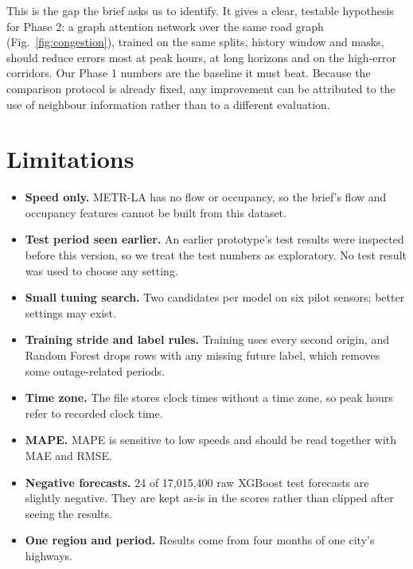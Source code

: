 \documentclass[conference]{IEEEtran}
\begin{document}
This is the gap the brief asks us to identify. It gives a clear, testable hypothesis for Phase 2: a graph attention network \cite{gat} over the same road graph (Fig.~\ref{fig:congestion}), trained on the same splits, history window and masks, should reduce errors most at peak hours, at long horizons and on the high-error corridors. Our Phase 1 numbers are the baseline it must beat. Because the comparison protocol is already fixed, any improvement can be attributed to the use of neighbour information rather than to a different evaluation.

\section{Limitations}
\begin{itemize}
\item \textbf{Speed only.} METR-LA has no flow or occupancy, so the brief's flow and occupancy features cannot be built from this dataset.
\item \textbf{Test period seen earlier.} An earlier prototype's test results were inspected before this version, so we treat the test numbers as exploratory. No test result was used to choose any setting.
\item \textbf{Small tuning search.} Two candidates per model on six pilot sensors; better settings may exist.
\item \textbf{Training stride and label rules.} Training uses every second origin, and Random Forest drops rows with any missing future label, which removes some outage-related periods.
\item \textbf{Time zone.} The file stores clock times without a time zone, so peak hours refer to recorded clock time.
\item \textbf{MAPE.} MAPE is sensitive to low speeds and should be read together with MAE and RMSE.
\item \textbf{Negative forecasts.} 24 of 17,015,400 raw XGBoost test forecasts are slightly negative. They are kept as-is in the scores rather than clipped after seeing the results.
\item \textbf{One region and period.} Results come from four months of one city's highways.
\end{itemize}
\end{document}
